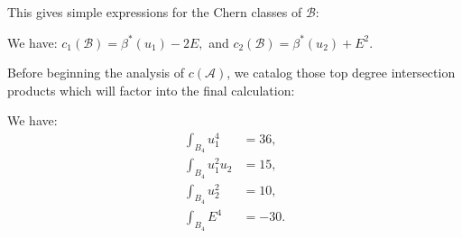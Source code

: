 \documentclass[12pt,reqno]{amsart}
\numberwithin{equation}{section}
\begin{document}
This gives simple expressions for the Chern classes of $\mathcal{B}$:
\begin{corollary}
  \label{cor:cB} We have: $c_{1}(\mathcal{B}) = \beta^{*}(u_{1}) -2E,$
  and $c_{2}(\mathcal{B}) = \beta^{*}(u_{2}) + E^{2}$.
\end{corollary}

Before beginning the analysis of $c(\mathcal{A})$, we catalog those
top degree intersection products which will factor into the final calculation:

\begin{proposition}
  \label{prop:monomialsU} We have:
  \begin{align}
    \label{eq:monU}
     \int_{B_{4}} u_{1}^{4} &= 36,\\
   \int_{B_{4}}  u_{1}^{2}u_{2} &= 15,\\
   \int_{B_{4}}  u_{2}^{2} &= 10,\\
   \int_{B_{4}}  E^{4} &= -30.
  \end{align}
\end{proposition}
\end{document}

